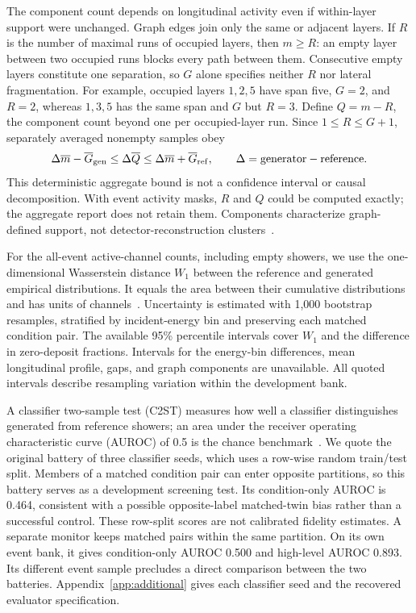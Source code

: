 \documentclass[11pt]{article}
\begin{document}
The component count depends on longitudinal activity even if within-layer support were unchanged. Graph edges join only the same or adjacent layers. If $R$ is the number of maximal runs of occupied layers, then $m\geq R$: an empty layer between two occupied runs blocks every path between them. Consecutive empty layers constitute one separation, so $G$ alone specifies neither $R$ nor lateral fragmentation. For example, occupied layers $1,2,5$ have span five, $G=2$, and $R=2$, whereas $1,3,5$ has the same span and $G$ but $R=3$. Define $Q=m-R$, the component count beyond one per occupied-layer run. Since $1\leq R\leq G+1$, separately averaged nonempty samples obey
\[
 \Delta\overline m-\overline G_{\rm gen}\leq\Delta\overline Q
 \leq\Delta\overline m+\overline G_{\rm ref},
 \qquad \Delta=\mathrm{generator}-\mathrm{reference}.
\]
This deterministic aggregate bound is not a confidence interval or causal decomposition. With event activity masks, $R$ and $Q$ could be computed exactly; the aggregate report does not retain them. Components characterize graph-defined support, not detector-reconstruction clusters~\cite{atlastopocluster}.

For the all-event active-channel counts, including empty showers, we use the one-dimensional Wasserstein distance $W_1$ between the reference and generated empirical distributions. It equals the area between their cumulative distributions and has units of channels~\cite{kansalmetrics}. Uncertainty is estimated with 1,000 bootstrap resamples, stratified by incident-energy bin and preserving each matched condition pair. The available 95\% percentile intervals cover $W_1$ and the difference in zero-deposit fractions. Intervals for the energy-bin differences, mean longitudinal profile, gaps, and graph components are unavailable. All quoted intervals describe resampling variation within the development bank.

A classifier two-sample test (C2ST) measures how well a classifier distinguishes generated from reference showers; an area under the receiver operating characteristic curve (AUROC) of 0.5 is the chance benchmark~\cite{c2st,kansalmetrics}. We quote the original battery of three classifier seeds, which uses a row-wise random train/test split. Members of a matched condition pair can enter opposite partitions, so this battery serves as a development screening test. Its condition-only AUROC is 0.464, consistent with a possible opposite-label matched-twin bias rather than a successful control. These row-split scores are not calibrated fidelity estimates. A separate monitor keeps matched pairs within the same partition. On its own event bank, it gives condition-only AUROC 0.500 and high-level AUROC 0.893. Its different event sample precludes a direct comparison between the two batteries. Appendix~\ref{app:additional} gives each classifier seed and the recovered evaluator specification.
\end{document}
